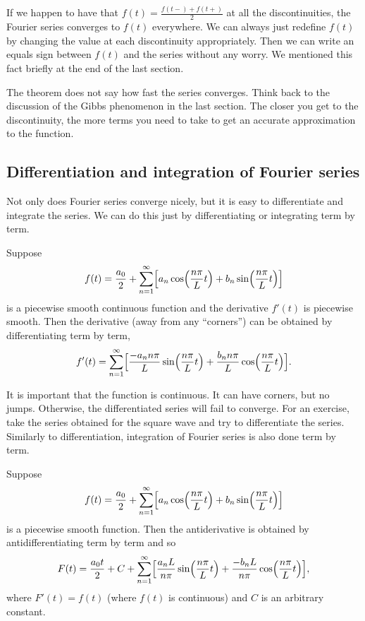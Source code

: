 If we happen to have that
$f(t) = \frac{f(t-)+f(t+)}{2}$ at all the discontinuities, the Fourier series
converges to $f(t)$ everywhere.  We can always just redefine $f(t)$
by changing the value at each discontinuity appropriately.  Then we can write
an equals sign between $f(t)$ and the series without any worry.
We mentioned this fact
briefly at the end of the last section.

The theorem does not say how fast the series converges.
Think back to the discussion of the Gibbs phenomenon in the last section.
The closer you get to the discontinuity, the more terms you need to take
to get an accurate approximation to the function.

\subsection{Differentiation and integration of Fourier series}

Not only does Fourier series converge nicely, but it is easy to differentiate
and integrate the series.  We can do this just by differentiating or
integrating term by term.

\begin{theorem}
Suppose
\begin{equation*}
f(t) = \frac{a_0}{2} +
\sum_{n=1}^\infty
\Bigl[
a_n \cos \Bigl( \frac{n \pi}{L} t \Bigr)
+ b_n \sin \Bigl( \frac{n \pi}{L} t \Bigr)
\Bigr]
\end{equation*}
is a piecewise smooth continuous function and the derivative $f'(t)$ is
piecewise smooth.  Then the derivative (away from any ``corners'') can be
obtained by differentiating term by term,
\begin{equation*}
f'(t) = \sum_{n=1}^\infty
\Bigl[
\frac{-a_n n \pi}{L} 
\sin \Bigl( \frac{n \pi}{L} t \Bigr)
+ \frac{b_n n \pi}{L} \cos \Bigl( \frac{n \pi}{L} t \Bigr)
\Bigr] .
\end{equation*}
\end{theorem}

It is important that the function is continuous.  It can have corners, but no
jumps.  Otherwise, the differentiated series will fail to converge.  For an
exercise, take the series obtained for the square wave and try to
differentiate the series.
Similarly to differentiation,
integration of Fourier series is also done term by term.

\begin{theorem}
Suppose
\begin{equation*}
f(t) = \frac{a_0}{2} + \sum_{n=1}^\infty
\Bigl[
a_n \cos \Bigl( \frac{n \pi}{L} t \Bigr)
+ b_n \sin \Bigl( \frac{n \pi}{L} t \Bigr)
\Bigr]
\end{equation*}
is a piecewise smooth function.  Then the antiderivative is
obtained by antidifferentiating term by term and so
\begin{equation*}
F(t) = \frac{a_0 t}{2} + C + \sum_{n=1}^\infty
\Bigl[
\frac{a_n L}{n \pi} \sin \Bigl( \frac{n \pi}{L} t \Bigr)
+ \frac{-b_n L}{n \pi}  \cos \Bigl( \frac{n \pi}{L} t \Bigr)
\Bigr] ,
\end{equation*}
where $F'(t) = f(t)$ (where $f(t)$ is continuous) and $C$ is an arbitrary constant.
\end{theorem}

